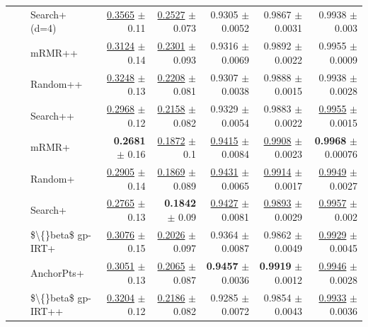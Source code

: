 \begin{longtable}{llp{}rrrrr}
 &  & Search+ (d=4) & \underline{0.3565} {\scriptsize $\pm$ 0.11} & \underline{0.2527} {\scriptsize $\pm$ 0.073} & 0.9305 {\scriptsize $\pm$ 0.0052} & 0.9867 {\scriptsize $\pm$ 0.0031} & 0.9938 {\scriptsize $\pm$ 0.003} \\
 &  & mRMR++ & \underline{0.3124} {\scriptsize $\pm$ 0.14} & \underline{0.2301} {\scriptsize $\pm$ 0.093} & 0.9316 {\scriptsize $\pm$ 0.0069} & 0.9892 {\scriptsize $\pm$ 0.0022} & 0.9955 {\scriptsize $\pm$ 0.0009} \\
 &  & Random++ & \underline{0.3248} {\scriptsize $\pm$ 0.13} & \underline{0.2208} {\scriptsize $\pm$ 0.081} & 0.9307 {\scriptsize $\pm$ 0.0038} & 0.9888 {\scriptsize $\pm$ 0.0015} & 0.9938 {\scriptsize $\pm$ 0.0028} \\
 &  & Search++ & \underline{0.2968} {\scriptsize $\pm$ 0.12} & \underline{0.2158} {\scriptsize $\pm$ 0.082} & 0.9329 {\scriptsize $\pm$ 0.0054} & 0.9883 {\scriptsize $\pm$ 0.0022} & \underline{0.9955} {\scriptsize $\pm$ 0.0015} \\
 &  & mRMR+ & \textbf{0.2681} {\scriptsize $\pm$ 0.16} & \underline{0.1872} {\scriptsize $\pm$ 0.1} & \underline{0.9415} {\scriptsize $\pm$ 0.0084} & \underline{0.9908} {\scriptsize $\pm$ 0.0023} & \textbf{0.9968} {\scriptsize $\pm$ 0.00076} \\
 &  & Random+ & \underline{0.2905} {\scriptsize $\pm$ 0.14} & \underline{0.1869} {\scriptsize $\pm$ 0.089} & \underline{0.9431} {\scriptsize $\pm$ 0.0065} & \underline{0.9914} {\scriptsize $\pm$ 0.0017} & \underline{0.9949} {\scriptsize $\pm$ 0.0027} \\
 &  & Search+ & \underline{0.2765} {\scriptsize $\pm$ 0.13} & \textbf{0.1842} {\scriptsize $\pm$ 0.09} & \underline{0.9427} {\scriptsize $\pm$ 0.0081} & \underline{0.9893} {\scriptsize $\pm$ 0.0029} & \underline{0.9957} {\scriptsize $\pm$ 0.002} \\
 &  & \$\textbackslash\{\}beta\$ gp-IRT+ & \underline{0.3076} {\scriptsize $\pm$ 0.15} & \underline{0.2026} {\scriptsize $\pm$ 0.097} & 0.9364 {\scriptsize $\pm$ 0.0087} & 0.9862 {\scriptsize $\pm$ 0.0049} & \underline{0.9929} {\scriptsize $\pm$ 0.0045} \\
 &  & AnchorPts+ & \underline{0.3051} {\scriptsize $\pm$ 0.13} & \underline{0.2065} {\scriptsize $\pm$ 0.087} & \textbf{0.9457} {\scriptsize $\pm$ 0.0036} & \textbf{0.9919} {\scriptsize $\pm$ 0.0012} & \underline{0.9946} {\scriptsize $\pm$ 0.0028} \\
 &  & \$\textbackslash\{\}beta\$ gp-IRT++ & \underline{0.3204} {\scriptsize $\pm$ 0.12} & \underline{0.2186} {\scriptsize $\pm$ 0.082} & 0.9285 {\scriptsize $\pm$ 0.0072} & 0.9854 {\scriptsize $\pm$ 0.0043} & \underline{0.9933} {\scriptsize $\pm$ 0.0036} \\

\end{longtable}
